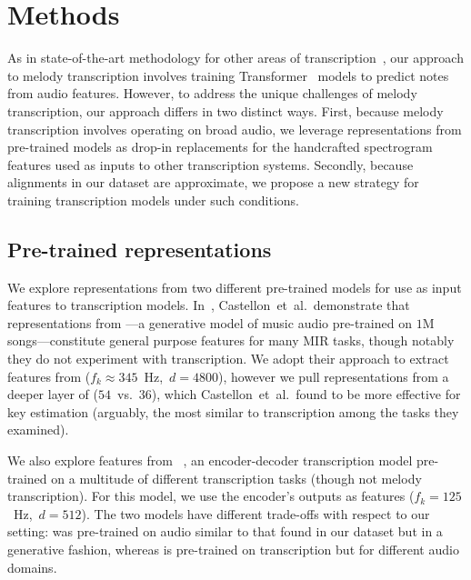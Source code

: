 \section{Methods}

As in state-of-the-art methodology for other areas of transcription~\cite{hawthorne2021sequence}, 
our approach to melody transcription involves training Transformer~\cite{vaswani2017attention} models to predict notes from audio features. 
However, to address the unique challenges of melody transcription, our approach differs in two distinct ways. 
First, because melody transcription involves operating on broad audio, we leverage representations from pre-trained models as drop-in replacements for the handcrafted spectrogram features used as inputs to other transcription systems. 
Secondly, because alignments in our dataset are approximate, we propose a new strategy for training transcription models under such conditions.

\subsection{Pre-trained representations}
\label{sec:representations}

We explore representations from two different pre-trained models for use as input features to transcription models.
In~\cite{castellon2021calm}, Castellon~et~al.\ demonstrate that representations from \jukebox---a generative model of music audio pre-trained on $1$M songs---constitute general purpose features for many MIR tasks, though notably they do not experiment with transcription. 
We adopt their approach to extract features from \jukebox{} (${f_k \approx 345}$~Hz,~${d = 4800}$), however we pull representations from a deeper layer of \jukebox{} ($54$~vs.~$36$), which Castellon~et~al.\ found to be more effective for key estimation (arguably, the most similar to transcription among the tasks they examined).

We also explore features from \mtthree~\cite{gardner2021mt3}, an encoder-decoder transcription model pre-trained on a multitude of different transcription tasks (though not melody transcription). 
For this model, we use the encoder's outputs as features (${f_k = 125}$~Hz,~${d = 512}$). 
The two models have different trade-offs with respect to our setting: \jukebox{} was pre-trained on audio similar to that found in our dataset but in a generative fashion, 
whereas \mtthree{} is pre-trained on transcription but for different audio domains. 


